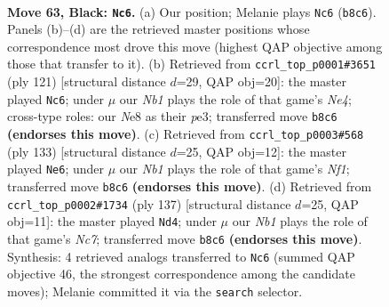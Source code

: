 \documentclass[11pt]{article}
\begin{document}
\clearpage

\begin{figure}[p]\centering
\begin{subfigure}{0.46\textwidth}\centering
\resizebox{\linewidth}{!}{%
\newchessgame
\chessboard[
  setfen={1n1kn3/1Q6/8/P6K/5q2/8/3N4/8 b - - 0 63},
  showmover=false,
  pgfstyle=straightmove, color=movearrow, markmove={b8-c6}
]}
\caption{}
\end{subfigure}\hfill
\begin{subfigure}{0.46\textwidth}\centering
\resizebox{\linewidth}{!}{%
\newchessgame
\chessboard[
  setfen={8/8/4k3/1q2n3/3Q4/4P3/8/3K4 b - - 9 61},
  showmover=false,
  pgfstyle=straightmove, color=movearrow, markmove={e5-c6}
]}
\caption{}
\end{subfigure}
\\[4pt]
\begin{subfigure}{0.46\textwidth}\centering
\resizebox{\linewidth}{!}{%
\newchessgame
\chessboard[
  setfen={5nk1/8/8/3q3P/5Q2/7K/6N1/8 b - - 0 67},
  showmover=false,
  pgfstyle=straightmove, color=movearrow, markmove={f8-e6}
]}
\caption{}
\end{subfigure}\hfill
\begin{subfigure}{0.46\textwidth}\centering
\resizebox{\linewidth}{!}{%
\newchessgame
\chessboard[
  setfen={8/8/1k6/8/Q7/8/KPnq4/8 b - - 17 69},
  showmover=false,
  pgfstyle=straightmove, color=movearrow, markmove={c2-d4}
]}
\caption{}
\end{subfigure}
\caption{\textbf{Move 63, Black: \texttt{Nc6}.} (a) Our position; Melanie plays \texttt{Nc6} (\texttt{b8c6}). Panels (b)--(d) are the retrieved master positions whose correspondence most drove this move (highest QAP objective among those that transfer to it). (b) Retrieved from \texttt{ccrl\_top\_p0001\#3651} (ply 121) [structural distance $d$=29, QAP obj=20]: the master played \texttt{Nc6}; under $\mu$ our \emph{Nb1} plays the role of that game's \emph{Ne4}; cross-type roles: our \emph{N}e8 as their \emph{p}e3; transferred move \texttt{b8c6} \textbf{(endorses this move)}. (c) Retrieved from \texttt{ccrl\_top\_p0003\#568} (ply 133) [structural distance $d$=25, QAP obj=12]: the master played \texttt{Ne6}; under $\mu$ our \emph{Nb1} plays the role of that game's \emph{Nf1}; transferred move \texttt{b8c6} \textbf{(endorses this move)}. (d) Retrieved from \texttt{ccrl\_top\_p0002\#1734} (ply 137) [structural distance $d$=25, QAP obj=11]: the master played \texttt{Nd4}; under $\mu$ our \emph{Nb1} plays the role of that game's \emph{Nc7}; transferred move \texttt{b8c6} \textbf{(endorses this move)}. Synthesis: 4 retrieved analogs transferred to \texttt{Nc6} (summed QAP objective 46, the strongest correspondence among the candidate moves); Melanie committed it via the \texttt{search} selector.}
\label{fig:thought-m125}
\end{figure}
\end{document}
